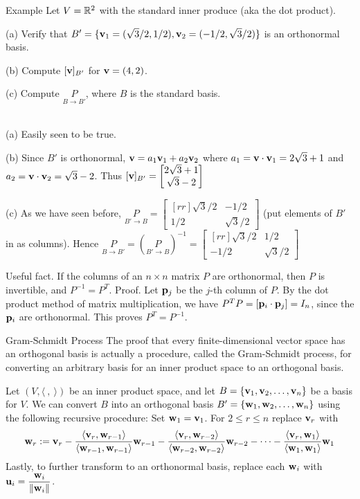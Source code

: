 \begin{frame}{Example}
Let $V={\mathbb R}^2$ with the standard inner produce (aka the dot product). 

(a) Verify that $B'=\{{\mathbf v}_1=(\sqrt{3}/2,1/2), {\mathbf v}_2=(-1/2,\sqrt{3}/2)\}$ is an orthonormal basis. 

(b) Compute $[{\mathbf v}]_{B'}$ for ${\mathbf v}=(4,2)$. 

(c) Compute $\underset{B\rightarrow B'}{P}$, where $B$ is the standard basis. 
\begin{bsolution}
\ \\
(a) Easily seen to be true. 

(b) Since $B'$ is orthonormal, ${\mathbf v}=a_1{\mathbf v}_1+a_2{\mathbf v}_2$ where $a_1={\mathbf v}\cdot{\mathbf v}_1=2\sqrt{3}+1$ and $a_2={\mathbf v}\cdot{\mathbf v}_2=\sqrt{3}-2$. Thus $[{\mathbf v}]_{B'}=\begin{bmatrix}
2\sqrt{3}+1\\
\sqrt{3}-2
\end{bmatrix}
$

\pause
(c) As we have seen before, $\underset{B'\rightarrow B}{P}=\begin{bmatrix}[rr]
\sqrt{3}/2&-1/2\\1/2&\sqrt{3}/2
\end{bmatrix}$ (put elements of $B'$ in as columns). Hence $\underset{B\rightarrow B'}{P}=(\underset{B'\rightarrow B}{P})^{-1}=\begin{bmatrix}[rr]
\sqrt{3}/2&1/2\\-1/2&\sqrt{3}/2
\end{bmatrix}
$
\end{bsolution}

\pause\alert{Useful fact}. If the columns of an $n\times n$ matrix $P$ are orthonormal, then $P$ is invertible, and $\boxed{P^{-1}=P^T}$. 
\bpause
\alert{Proof}. Let ${\mathbf p}_j$ be the $j$-th column of $P$. By the \alert{dot product method} of matrix multiplication, we have 
$P^TP=[{\mathbf p}_i\cdot{\mathbf p}_j]=I_n$, since the ${\mathbf p}_i$ are orthonormal. This proves $P^T=P^{-1}$. 
\end{frame}
\begin{frame}{Gram-Schmidt Process}
The proof that every finite-dimensional vector space has an orthogonal basis is actually a procedure, called the \alert{Gram-Schmidt process}, for converting an arbitrary basis for an inner product space to an orthogonal basis.
\pause
\begin{theorem}
Let $(V, \langle \ , \ \rangle)$ be an inner product space, and let $B=\{{\mathbf v}_1, {\mathbf v}_2, \dots, {\mathbf v}_n\}$ be a basis for $V$. We can convert $B$ into an orthogonal basis $B'=\{{\mathbf w}_1, {\mathbf w}_2, \dots, {\mathbf w}_n\}$ using the following recursive procedure: 
\bb
\ii Set ${\mathbf w}_1={\mathbf v}_1$. 
\ii For $2\leq r\leq n$ replace ${\mathbf v}_r$ with 
\[
{\mathbf w}_r:={\mathbf v}_r-\frac{\langle {\mathbf v}_r, {\mathbf w}_{r-1}\rangle}{\langle {\mathbf w}_{r-1},{\mathbf w}_{r-1}\rangle}{\mathbf w}_{r-1}-\frac{\langle {\mathbf v}_r, {\mathbf w}_{r-2}\rangle}{\langle {\mathbf w}_{r-2},{\mathbf w}_{r-2}\rangle}{\mathbf w}_{r-2}-\cdots -\frac{\langle {\mathbf v}_r, {\mathbf w}_{1}\rangle}{\langle {\mathbf w}_{1},{\mathbf w}_{1}\rangle}{\mathbf w}_1
\]
\ee
Lastly, to further transform to an orthonormal basis, replace each ${\mathbf w}_i$ with $\displaystyle {\mathbf u}_i=\frac{{\mathbf w}_i}{\left\lVert{\mathbf w}_i\right\rVert}$. 
\end{theorem}
\end{frame}
